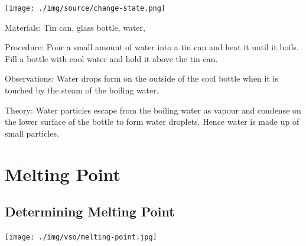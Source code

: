 \begin{multicols}{2}
\begin{center}
\texttt{[image: ./img/source/change-state.png]}
\end{center}

\begin{description*}
\item[Materials:]{Tin can, glass bottle, water, }
\item[Procedure:]{Pour a small amount of water into a tin can and heat it until it boils. Fill a bottle with cool water and hold it above the tin can.}
\item[Observations:]{Water drops form on the outside of the cool bottle when it is touched by the steam of the boiling water.}
\item[Theory:]{Water particles escape from the boiling water as vapour and condense on the lower surface of the bottle to form water droplets. Hence water is made up of small particles.}
\end{description*}

\columnbreak


\section*{Melting Point}


\subsection{Determining Melting Point}

\begin{center}
\texttt{[image: ./img/vso/melting-point.jpg]}
\end{center}


\end{multicols}
